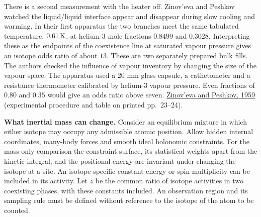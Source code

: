 \documentclass[11pt,a4paper]{article}
\begin{document}
There is a second measurement with the heater off. Zinov'eva and Peshkov
watched the liquid/liquid interface appear and disappear during slow
cooling and warming. In their first apparatus the two branches meet the
same tabulated temperature, \(0.61\,{\rm K}\), at helium-3 mole
fractions \(0.8499\) and \(0.3028\). Interpreting these as the endpoints
of the coexistence line at saturated vapour pressure gives an isotope
odds ratio of about \(13\). These are two separately prepared bulk
fills. The authors checked the influence of vapour inventory by changing
the size of the vapour space. The apparatus used a 20 mm glass capsule,
a cathetometer and a resistance thermometer calibrated by helium-3
vapour pressure. Even fractions of \(0.80\) and \(0.35\) would give an
odds ratio above seven.
\href{https://jetp.ras.ru/cgi-bin/dn/e_010_01_0022.pdf}{Zinov'eva and
Peshkov, 1959} (experimental procedure and table on printed pp.~23--24).

\textbf{What inertial mass can change.} Consider an equilibrium mixture
in which either isotope may occupy any admissible atomic position. Allow
hidden internal coordinates, many-body forces and smooth ideal holonomic
constraints. For the mass-only comparison the constraint surface, its
statistical weights apart from the kinetic integral, and the positional
energy are invariant under changing the isotope at a site. An
isotope-specific constant energy or spin multiplicity can be included in
its activity. Let \(z\) be the common ratio of isotope activities in two
coexisting phases, with these constants included. An observation region
and its sampling rule must be defined without reference to the isotope
of the atom to be counted.
\end{document}
